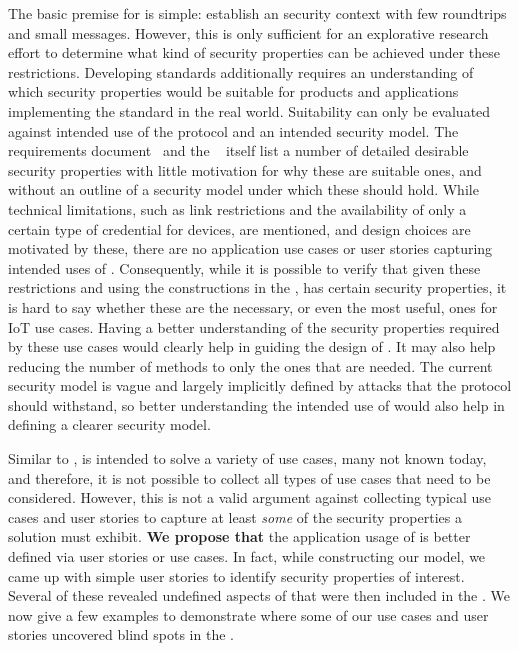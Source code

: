 \documentclass[runningheads,draft,x11names]{llncs}
\begin{document}
The basic premise for \mEdhoc{} is simple: establish an \mOscore{} security
context with few roundtrips and small messages.
%
However, this is only sufficient for an explorative research effort
to determine what kind of security properties can be achieved under these
restrictions.
%
Developing standards additionally requires an understanding of which security
properties would be suitable for products and applications implementing the
standard in the real world.
%
Suitability can only be evaluated against intended use of the protocol and an
intended security model.
%
The requirements document~\cite{ietf-lake-reqs-04} and the
\mSpec{}~\cite{selander-lake-edhoc-01} itself list a
number of detailed desirable security properties with little motivation for why
these are suitable ones, and without an outline of a security model under which these
should hold.
%
While technical limitations, such as link restrictions and
the availability of only a certain type of credential for devices,
are mentioned, and design choices are motivated by these, there are no
application use cases or user stories capturing intended uses of \mEdhoc{}.
%
Consequently, while it is possible to verify that given these restrictions and
using the constructions in the \mSpec{}, \mEdhoc{} has certain security
properties, it is hard to say whether these are the necessary, or even the
most useful, ones for IoT use cases.
%
Having a better understanding of the security properties required by these use
cases would clearly help in guiding the design of \mEdhoc{}.
%
It may also help reducing the number of methods to only the ones that are needed.
%
%
The current security model is vague and largely implicitly defined by attacks
that the protocol should withstand, so better understanding the intended use of \mEdhoc{} would also help in defining a clearer security model.
%

Similar to \mDandTls{}, \mEdhoc{} is intended to solve a variety of use cases,
many not known today, and therefore, it is not possible to collect all types
of use cases that need to be considered.
%
However, this is not a valid argument against collecting typical use cases and
user stories to capture at least \emph{some} of the security properties a
solution must exhibit.
%
\textbf{We propose that} the application usage of \mEdhoc{} is better defined via
user stories or use cases.
%
In fact, while constructing our model, we came up with simple user stories to
identify security properties of interest.
%
Several of these revealed undefined aspects of \mEdhoc{} that were then included
in the \mSpec.
%
We now give a few examples to demonstrate where some of our use cases and user
stories uncovered blind spots in the \mSpec.
%
\end{document}
